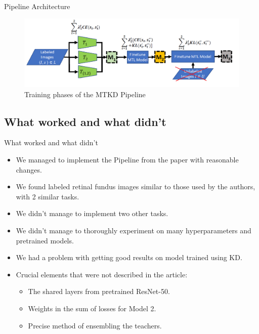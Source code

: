 \documentclass [xcolor=svgnames, t] {beamer}
\begin{document}
\begin{frame}{Pipeline Architecture}
\vspace{10mm}
    \centering
    \begin{figure}[H]
    \includegraphics[width=1\textwidth]{pipe.png}
    \caption{Training phases of the MTKD Pipeline}
    \end{figure}
\end{frame}


\subsection{What worked and what didn't}
\begin{frame}{What worked and what didn't}
\begin{itemize}
    \item We managed to implement the Pipeline from the paper with reasonable changes. 
    \item We found labeled retinal fundus images similar to those used by the authors, with 2 similar tasks.

    \item We didn't manage to implement two other tasks.
    \item We didn't manage to thoroughly experiment on many hyperparameters and pretrained models.
    \item We had a problem with getting good results on model trained using KD.
    \item Crucial elements that were not described in the article:
    \begin{itemize}
        
        \item The shared layers from  pretrained ResNet-50.
        \item Weights in the sum of losses for Model 2.
        \item Precise method of ensembling the teachers.
        
    \end{itemize}
\end{itemize}

\end{frame}
\end{document}
